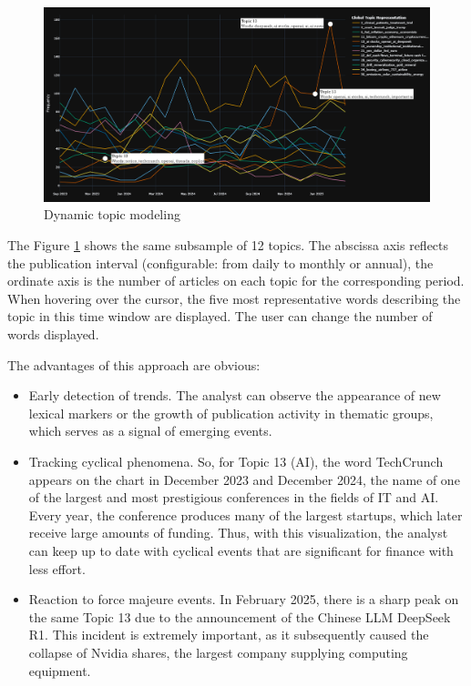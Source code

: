 \begin{figure}[H]
    \centering
    \includegraphics[width=1\linewidth]{img/dynamic_topic_modeling.png}
    \caption{Dynamic topic modeling}
    \label{fig:dtm}
\end{figure}

The Figure \ref{fig:dtm} shows the same subsample of 12 topics. The abscissa axis reflects the publication
interval (configurable: from daily to monthly or annual), the ordinate axis is the number of articles on each
topic for the corresponding period. When hovering over the cursor, the five most representative words describing
the topic in this time window are displayed. The user can change the number of words displayed.

The advantages of this approach are obvious:

\begin{itemize}
    \item Early detection of trends. The analyst can observe the appearance of new lexical markers or the growth
    of publication activity in thematic groups, which serves as a signal of emerging events.
    \item Tracking cyclical phenomena. So, for Topic 13 (AI), the word TechCrunch appears on the chart in December
    2023 and December 2024, the name of one of the largest and most prestigious conferences in the fields of IT and AI.
    Every year, the conference produces many of the largest startups, which later receive large amounts of funding.
    Thus, with this visualization, the analyst can keep up to date with cyclical events that are significant for finance
    with less effort.
    \item Reaction to force majeure events. In February 2025, there is a sharp peak on the same Topic 13 due
    to the announcement of the Chinese LLM DeepSeek R1. This incident is extremely important, as it subsequently
    caused the collapse of Nvidia shares, the largest company supplying computing equipment.
\end{itemize}

